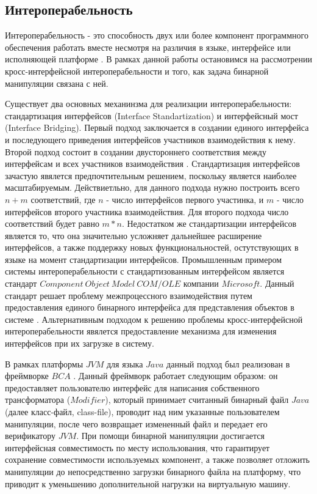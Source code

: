 \subsection{Интероперабельность}

Интероперабельность - это способность двух или более компонент программного обеспечения работать вместе несмотря на различия в языке, интерфейсе или исполняющей платформе \cite{malone2014}. В рамках данной работы остановимся на рассмотрении кросс-интерфейсной интероперабельности и того, как задача бинарной манипуляции связана с ней.

Существует два основных механинзма для реализации интероперабельности: стандартизация интерфейсов (Interface Standartization) и интерфейсный мост (Interface Bridging). Первый подход заключается в создании единого интерфейса и последующего приведения интерфейсов участников взаимодействия к нему. Второй подход состоит в создании двустороннего соответствия между интерфейсам и всех участников взаимодействия \cite{wegner1996}. Стандартизация интерфейсов зачастую явялется предпочтительным решением, поскольку является наиболее масштабируемым. Действиетльно, для данного подхода нужно построить всего $n + m$ соответствий, где $n$ - число интерфейсов первого участинка, и $m$ - число интерфейсов второго участника взаимодействия. Для второго подхода число соответствий будет равно $m * n$. Недостатком же стандартизации интерфейсов является то, что она значительно усложняет дальнейшее расширение интерфейсов, а также поддержку новых функциональностей, остутствующих в языке на момент стандартизации интерфейсов. Промышленным примером системы интероперабельности с стандартизованным интерфейсом является стандарт $Component~Object~Model~COM/OLE$ компании $Microsoft$. Данный стандарт решает проблему межпроцессного взаимодействия путем предоставления единого бинарного интерфейса для представления объектов в системе \cite{brockschmidt1995}. Альтернативным подходом к решению проблемы кросс-интерфейсной интероперабельности явялется предоставление механизма для изменения интерфейсов при их загрузке в систему.

В рамках платформы $JVM$ для языка $Java$ данный подход был реализован в фреймворке $BCA$ \cite{bca}. Данный фреймворк работает следующим образом: он предоставляет пользователю интерфейс для написания собственного трансформатора ($Modifier$), который принимает считанный бинарный файл $Java$ (далее класс-файл, class-file), проводит над ним указанные пользователем манипуляции, после чего возвращает измененный файл и передает его верификатору $JVM$. При помощи бинарной манипуляции достигается интерфейсная совместимость по месту использования, что гарантирует сохранение совместимости используемых компонент, а также позволяет отложить манипуляции до непосредственно загрузки бинарного файла на платформу, что приводит к уменьшению дополнительной нагрузки на виртуальную машину.


